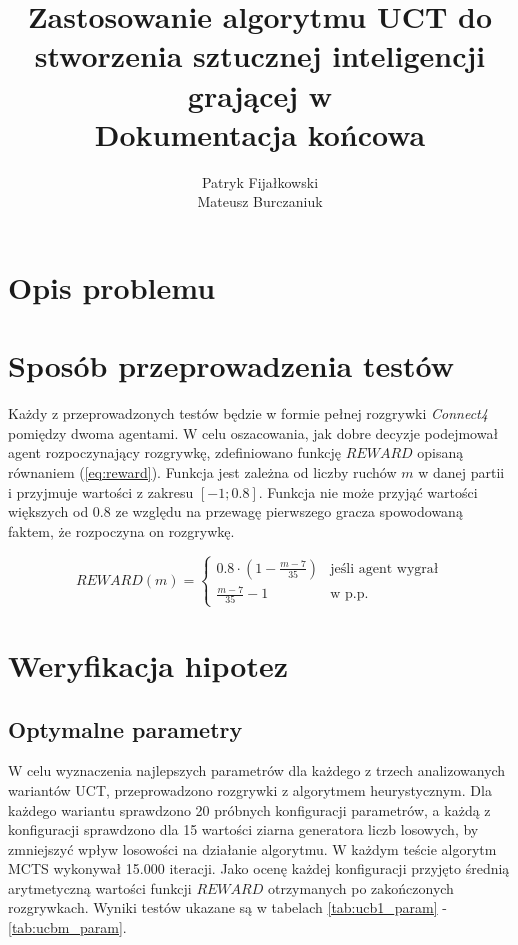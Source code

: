 \documentclass[a4paper,12pt]{article}
\title{
	Zastosowanie algorytmu UCT do stworzenia sztucznej inteligencji grającej w \nazwagry\\
	\large Dokumentacja końcowa}
\author{Patryk Fijałkowski \\ Mateusz Burczaniuk}
\let\oldsection\section
\renewcommand\section{\clearpage\oldsection}
\newcommand{\twopartdef}[3]
{
	\left\{
	\begin{array}{ll}
		#1 & \mbox{jeśli agent wygrał} #2 \\
		#3 & \mbox{w p.p. } 
	\end{array}
	\right.
}
\begin{document}
\begin{titlingpage}
	\maketitle
	\vspace{3cm}
\end{titlingpage}

\section{Opis problemu}


\section{Sposób przeprowadzenia testów}
Każdy z przeprowadzonych testów będzie w formie pełnej rozgrywki \textit{Connect4} pomiędzy dwoma agentami. W celu oszacowania, jak dobre decyzje podejmował agent rozpoczynający rozgrywkę, zdefiniowano funkcję $REWARD$ opisaną równaniem (\ref{eq:reward}). Funkcja jest zależna od liczby ruchów $m$ w danej partii i przyjmuje wartości z zakresu $[-1; 0.8]$. Funkcja nie może przyjąć wartości większych od $0.8$ ze względu na przewagę pierwszego gracza spowodowaną faktem, że rozpoczyna on rozgrywkę.

\begin{equation} \label{eq:reward}
	REWARD(m) = \twopartdef { 0.8 \cdot (1 - \frac{m-7}{35}) } {} {\frac{m-7}{35} - 1}
\end{equation}



\section{Weryfikacja hipotez}
\subsection{Optymalne parametry}
W celu wyznaczenia najlepszych parametrów dla każdego z trzech analizowanych wariantów UCT, przeprowadzono rozgrywki z algorytmem heurystycznym. Dla każdego wariantu sprawdzono 20 próbnych konfiguracji parametrów, a każdą z konfiguracji sprawdzono dla 15 wartości ziarna generatora liczb losowych, by zmniejszyć wpływ losowości na działanie algorytmu. W każdym teście algorytm MCTS wykonywał 15.000 iteracji. Jako ocenę każdej konfiguracji przyjęto średnią arytmetyczną wartości funkcji $REWARD$ otrzymanych po zakończonych rozgrywkach. Wyniki testów ukazane są w tabelach \ref{tab:ucb1_param} - \ref{tab:ucbm_param}.
\end{document}

